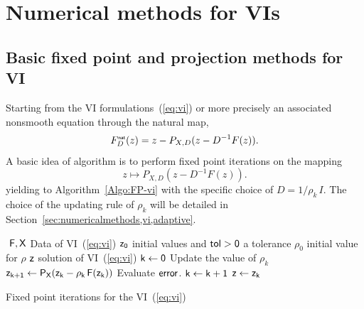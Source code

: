 \section{Numerical methods for VIs}
\label{sec:numericalmethods,vi}


\subsection{Basic fixed point  and projection methods for VI}

Starting from the VI formulations~(\ref{eq:vi}) or more precisely an associated nonsmooth equation through the natural map,
\begin{equation}
  \label{eq:skew-natural-NE-bis}
   F_D^\nat(z) = z - P_{X,D}(z-D^{-1} F(z)).
\end{equation}
A basic idea of algorithm is to perform fixed point iterations on the mapping
\begin{equation}
  \label{eq:skew-fixed-point}
   z \mapsto P_{X,D}(z-D^{-1} F(z)).
\end{equation}
yielding to Algorithm~\ref{Algo:FP-vi} with the specific choice of $D=1/\rho_k \, I$. The choice of the updating rule of $\rho_k$ will be detailed in Section~\ref{sec:numericalmethods,vi,adaptive}.

\begin{algorithm}
  \begin{algorithmic}
    {\sf
      \STATE $ $
      \REQUIRE $\sf F,X$ Data of VI~(\ref{eq:vi})
      \REQUIRE $\sf z_0$ initial values and $\sf tol >0$ a tolerance
      \REQUIRE $\rho_0$ initial value for $\rho$
      \ENSURE  $\sf z$ solution of VI~(\ref{eq:vi})
      \STATE   $\sf k \leftarrow 0$ 
      \STATE Update the value of $\rho_k$
      \STATE $\sf z_{k+1} \leftarrow P_{X}(z_k - \rho_k\,F(z_k))$
      \STATE Evaluate $\sf error$.
      \STATE $\sf k \leftarrow k+1$
      \ENDWHILE
      \STATE $\sf z \leftarrow z_{k}$ 
    }
  \end{algorithmic}
  \caption{Fixed point iterations for the VI~(\ref{eq:vi})}  \label{Algo:FP-vi}
\end{algorithm}


